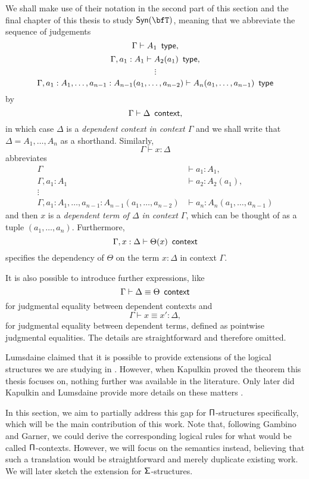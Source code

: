 \begin{notation}
  We shall make use of their notation \cite[4]{GG08} in the second part of this
  section and the final chapter of this thesis to study $\Syn{\bfT}$, meaning that
  we abbreviate the sequence of judgements
  \[\Gamma\vdash A_1\ \type,\]
  \[\Gamma,a_1:A_1\vdash A_2(a_1)\ \operatorname{\mathsf{type}},\]
  \[\vdots\]
  \[\Gamma,a_1:A_1,\ldots,a_{n-1}:A_{n-1}(a_1,\ldots,a_{n-2})\vdash
  A_n(a_1,\ldots,a_{n-1})\ \operatorname{\mathsf{type}}\]
  by
  \[\Gamma\vdash\Delta\ \operatorname{\mathsf{context}},\]
  in which case $\Delta$ is a \emph{dependent context in context $\Gamma$} and
  we shall write that $\Delta=A_1,\ldots,A_n$ as a shorthand.
  Similarly,
  \[\Gamma\vdash x:\Delta\]
  abbreviates
  \begin{align*}
    \Gamma &\vdash a_1:A_1, \\
    \Gamma,a_1:A_1 &\vdash a_2:A_2(a_1), \\
    \vdots & \\
    \Gamma,a_1:A_1,\ldots,a_{n-1}:A_{n-1}(a_1,\ldots,a_{n-2})
           &\vdash a_n:A_n(a_1,\ldots,a_{n-1})
  \end{align*}
  and then $x$ is a \emph{dependent term of $\Delta$ in context $\Gamma$}, which
  can be thought of as a tuple $(a_1,\ldots,a_n)$. Furthermore,
  \[\Gamma,x:\Delta\vdash\Theta(x)\ \operatorname{\mathsf{context}}\]
  specifies the dependency of $\Theta$ on the term $x:\Delta$ in context
  $\Gamma$.

  It is also possible to introduce further expressions, like
  \[\Gamma\vdash \Delta\equiv\Theta\ \context\]
  for judgmental equality between dependent contexts and
  \[\Gamma\vdash x\equiv x':\Delta,\]
  for judgmental equality between dependent terms, defined as pointwise
  judgmental equalities. The details are straightforward and therefore omitted.
\end{notation}

Lumsdaine claimed that it is possible to provide extensions of the logical
structures we are studying in \cite[Rem.\ 1.3.1]{Lum10}. However, when
Kapulkin proved the theorem this thesis focuses on,
nothing further was available in the literature. Only later did Kapulkin and
Lumsdaine provide more details on these matters \cite{KL18}. 

In this section, we aim
to partially address this gap for $\operatorname{\mathsf{\Pi}}$-structures specifically, which will be the main
contribution of this work. Note that, following Gambino and
Garner, we could derive the
corresponding logical rules for what would be called $\operatorname{\mathsf{\Pi}}$-contexts.
However, we will focus on the semantics instead, believing that such a
translation would be straightforward and merely duplicate existing work. We will
later sketch the extension for $\operatorname{\mathsf{\Sigma}}$-structures.

